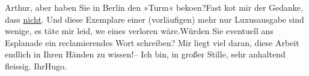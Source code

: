 \pstart
           Arthur, aber haben Sie in Berlin den »Turm« beko{\geminationm}en?\hspace*{1.5em}Fast ko{\geminationm}t mir der Gedanke,
               dass \uline{nicht}. Und diese Exemplare einer (vorläufigen)
               mehr nur Luxusausgabe sind wenige, es täte mir leid, we{\geminationn}
               eines verloren wäre.\hspace*{1.5em}Würden Sie eventuell ans Esplanade ein reclamierendes Wort schreiben? Mir
               liegt viel daran, diese Arbeit endlich in Ihren Händen zu wissen!\hspace*{1.5em}– Ich bin, in großer Stille, sehr anhaltend fleissig.\pend
           \pstart Ihr\spacefill\mbox{Hugo.}\pend{}\endnumbering{}  
      